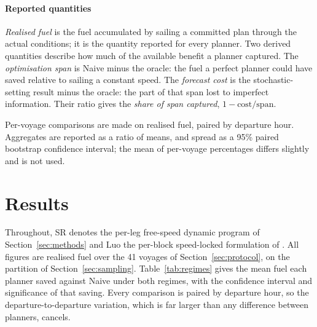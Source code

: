 \documentclass[review,authoryear]{elsarticle}
\begin{document}
\paragraph{Reported quantities}
\label{sec:quantities}
\emph{Realised fuel} is the fuel accumulated by sailing a committed plan through the actual
conditions; it is the quantity reported for every planner. Two derived quantities describe how much
of the available benefit a planner captured. The \emph{optimisation span} is Naive minus the oracle:
the fuel a perfect planner could have saved relative to sailing a constant speed. The \emph{forecast
cost} is the stochastic-setting result minus the oracle: the part of that span lost to imperfect
information. Their ratio gives the \emph{share of span captured}, $1-\text{cost}/\text{span}$.

Per-voyage comparisons are made on realised fuel, paired by departure hour. Aggregates are reported
as a ratio of means, and spread as a 95\% paired bootstrap confidence interval; the mean of
per-voyage percentages differs slightly and is not used.

\section{Results}
\label{sec:results}
Throughout, SR denotes the per-leg free-speed dynamic program of Section~\ref{sec:methods} and Luo
the per-block speed-locked formulation of \citet{luo2024}. All figures are realised fuel over the 41
voyages of Section~\ref{sec:protocol}, on the partition of Section~\ref{sec:sampling}.
Table~\ref{tab:regimes} gives the mean fuel each planner saved against Naive under both regimes,
with the confidence interval and significance of that saving. Every comparison is paired by
departure hour, so the departure-to-departure variation, which is far larger than any difference
between planners, cancels.
\end{document}
